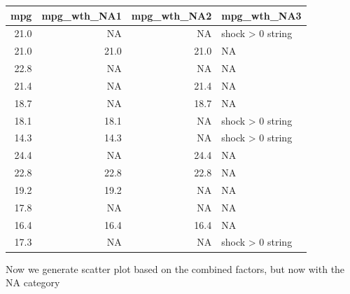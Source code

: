\documentclass[
]{book}
\newenvironment{Shaded}{\begin{snugshade}}{\end{snugshade}}
\newcommand{\CommentTok}[1]{\textcolor[rgb]{0.56,0.35,0.01}{\textit{#1}}}
\begin{document}
\begin{table}[!h]
\centering
\begin{tabular}{r|r|r|l}
\hline
mpg & mpg\_wth\_NA1 & mpg\_wth\_NA2 & mpg\_wth\_NA3\\
\hline
\rowcolor{gray!6}  21.0 & NA & NA & shock > 0 string\\
\hline
21.0 & 21.0 & 21.0 & NA\\
\hline
\rowcolor{gray!6}  22.8 & NA & NA & NA\\
\hline
21.4 & NA & 21.4 & NA\\
\hline
\rowcolor{gray!6}  18.7 & NA & 18.7 & NA\\
\hline
18.1 & 18.1 & NA & shock > 0 string\\
\hline
\rowcolor{gray!6}  14.3 & 14.3 & NA & shock > 0 string\\
\hline
24.4 & NA & 24.4 & NA\\
\hline
\rowcolor{gray!6}  22.8 & 22.8 & 22.8 & NA\\
\hline
19.2 & 19.2 & NA & NA\\
\hline
\rowcolor{gray!6}  17.8 & NA & NA & NA\\
\hline
16.4 & 16.4 & 16.4 & NA\\
\hline
\rowcolor{gray!6}  17.3 & NA & NA & shock > 0 string\\
\hline
\end{tabular}
\end{table}

\begin{Shaded}
\end{Shaded}

Now we generate scatter plot based on the combined factors, but now with the NA category
\end{document}
